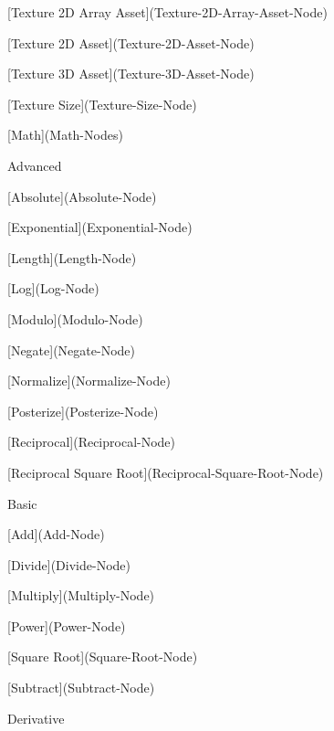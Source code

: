 \begin{DoxyItemize}
\begin{DoxyItemize}
\begin{DoxyItemize}
\begin{DoxyItemize}
\item \mbox{[}Texture 2D Array Asset\mbox{]}(Texture-\/2\+D-\/\+Array-\/\+Asset-\/\+Node)
\item \mbox{[}Texture 2D Asset\mbox{]}(Texture-\/2\+D-\/\+Asset-\/\+Node)
\item \mbox{[}Texture 3D Asset\mbox{]}(Texture-\/3\+D-\/\+Asset-\/\+Node)
\item \mbox{[}Texture Size\mbox{]}(Texture-\/\+Size-\/\+Node)
\end{DoxyItemize}
\end{DoxyItemize}
\item \mbox{[}Math\mbox{]}(Math-\/\+Nodes)
\begin{DoxyItemize}
\item Advanced
\begin{DoxyItemize}
\item \mbox{[}Absolute\mbox{]}(Absolute-\/\+Node)
\item \mbox{[}Exponential\mbox{]}(Exponential-\/\+Node)
\item \mbox{[}Length\mbox{]}(Length-\/\+Node)
\item \mbox{[}Log\mbox{]}(Log-\/\+Node)
\item \mbox{[}Modulo\mbox{]}(Modulo-\/\+Node)
\item \mbox{[}Negate\mbox{]}(Negate-\/\+Node)
\item \mbox{[}Normalize\mbox{]}(Normalize-\/\+Node)
\item \mbox{[}Posterize\mbox{]}(Posterize-\/\+Node)
\item \mbox{[}Reciprocal\mbox{]}(Reciprocal-\/\+Node)
\item \mbox{[}Reciprocal Square Root\mbox{]}(Reciprocal-\/\+Square-\/\+Root-\/\+Node)
\end{DoxyItemize}
\item Basic
\begin{DoxyItemize}
\item \mbox{[}Add\mbox{]}(Add-\/\+Node)
\item \mbox{[}Divide\mbox{]}(Divide-\/\+Node)
\item \mbox{[}Multiply\mbox{]}(Multiply-\/\+Node)
\item \mbox{[}Power\mbox{]}(Power-\/\+Node)
\item \mbox{[}Square Root\mbox{]}(Square-\/\+Root-\/\+Node)
\item \mbox{[}Subtract\mbox{]}(Subtract-\/\+Node)
\end{DoxyItemize}
\item Derivative
\begin{DoxyItemize}

\end{DoxyItemize}
\end{DoxyItemize}
\end{DoxyItemize}
\end{DoxyItemize}
